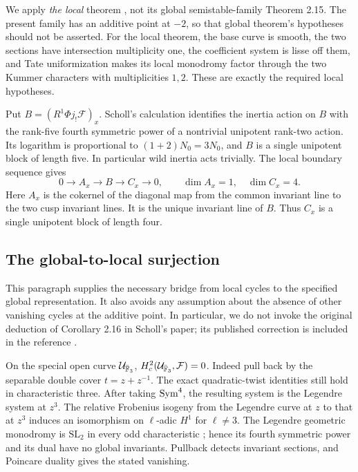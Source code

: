 We apply \emph{the local} theorem \cite[\S\S1.6--1.9]{SchollVanishing}, not its
global semistable-family Theorem 2.15. The present family has an additive
point at $-2$, so that global theorem's hypotheses should not be asserted.
For the local theorem, the base curve is smooth, the two sections have
intersection multiplicity one, the coefficient system is lisse off them,
and Tate uniformization makes its local monodromy factor through the two
Kummer characters with multiplicities $1,2$. These are exactly the required
local hypotheses.

Put $B=(R^1\Phi j_!\mathcal F)_x$. Scholl's calculation identifies the
inertia action on $B$ with the rank-five fourth symmetric power of a
nontrivial unipotent rank-two action. Its logarithm is proportional to
$(1+2)N_0=3N_0$, and $B$ is a single unipotent block of length five.
In particular wild inertia acts trivially.
The local boundary sequence \cite[\S1.7]{SchollVanishing} gives
\begin{equation}\label{p3:eq:ABC}
 0\longrightarrow A_x\longrightarrow B\longrightarrow C_x\longrightarrow0,
 \qquad \dim A_x=1,\quad \dim C_x=4.
\end{equation}
Here $A_x$ is the cokernel of the diagonal map from the common invariant
line to the two cusp invariant lines. It is the unique invariant line of $B$.
Thus $C_x$ is a single unipotent block of length four.

\subsection{The global-to-local surjection}
This paragraph supplies the necessary bridge from local cycles to the
specified global representation. It also avoids any assumption about the
absence of other vanishing cycles at the additive point. In particular,
we do not invoke the original deduction of Corollary 2.16 in Scholl's
paper; its published correction is included in the reference
\cite{SchollVanishing}.

On the special open curve $\mathcal U_{\bar{\mathbb F}_3}$,
$H_c^2(\mathcal U_{\bar{\mathbb F}_3},\mathcal F)=0$.
Indeed pull back by the separable double cover $t=z+z^{-1}$.
The exact quadratic-twist identities still hold in characteristic three.
After taking $\operatorname{Sym}^4$, the resulting system is the Legendre system at $z^3$.
The relative Frobenius isogeny from the Legendre curve at $z$ to that at $z^3$
induces an isomorphism on $\ell$-adic $H^1$ for $\ell\ne3$.
The Legendre geometric monodromy is $\mathrm{SL}_2$ in every odd
characteristic \cite[Chapter 15, opening discussion]{Katz}; hence its
fourth symmetric power and its dual have no global invariants. Pullback
detects invariant sections, and Poincare duality gives the stated vanishing.


